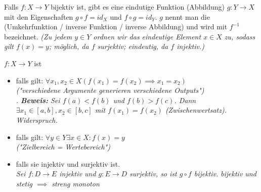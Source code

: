 Falls $f: X \rightarrow Y$ bijektiv ist, gibt es eine eindutige Funktion (Abbildung) $g: Y \rightarrow X$ mit den Eigenschaften $g \circ f = id_X$ und $f \circ g = id_Y$. $g$ nennt man die  (Umkehrfunktion / inverse Funktion / inverse Abbildung) und wird mit $f^{-1}$ bezeichnet.
\textit{(Zu jedem $y \in Y$ ordnen wir das eindeutige Element $x \in X$ zu, sodass gilt $f(x)=y$; möglich, da $f$ surjektiv; eindeutig, da $f$ injektiv.)}

$f: X \rightarrow Y$ ist
\begin{itemize}
    \item {} falls gilt: $\forall x_1, x_2 \in X (f(x_1) = f(x_2) \implies x_1 = x_2)$\\ \textit{("verschiedene Argumente generieren verschiedene Outputs")}\\
        \textit{. 
        \textbf{Beweis:} Sei $f(a)<f(b)$ und $f(b)>f(c)$. Dann $\exists x_1 \in [a,b], x_2 \in [b,c]$ mit $f(x_1)=f(x_2)$ (Zwischenwertsatz). Widerspruch.}
    \item {} falls gilt: $\forall y \in Y \exists x \in X : f(x) = y$\\ \textit{("Zielbereich = Wertebereich")}
    \item {} falls sie injektiv und surjektiv ist.\\
        \textit{Sei $f:D\rightarrow E$ injektiv und $g:E\rightarrow D$ surjektiv, so ist $g \circ f$ bijektiv.}
        \textit{bijektiv und stetig $\implies$ streng monoton}
\end{itemize}


